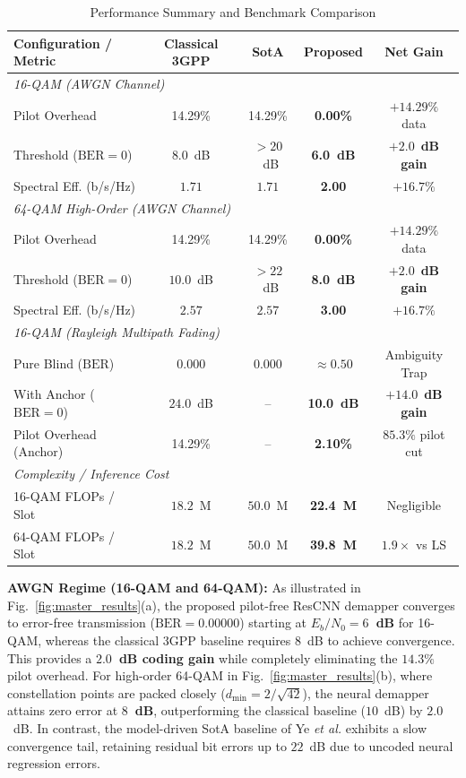 ﻿\documentclass[journal,twoside]{IEEEtran}
\begin{document}
\begin{table}[t]
\caption{Performance Summary and Benchmark Comparison}
\label{tab:perf_summary}
\centering
\footnotesize
\setlength{\tabcolsep}{3.5pt}
\begin{tabular}{lcccc}
\toprule
\textbf{Configuration / Metric} & \textbf{Classical 3GPP} & \textbf{SotA \cite{ye2018}} & \textbf{Proposed} & \textbf{Net Gain} \\
\midrule
\multicolumn{5}{l}{\textit{16-QAM (AWGN Channel)}} \\
Pilot Overhead & 14.29\% & 14.29\% & \textbf{0.00\%} & $+14.29\%$ data \\
Threshold ($\text{BER}=0$) & $8.0$~dB & $>20$~dB & \textbf{6.0~dB} & $\mathbf{+2.0}$~\textbf{dB gain} \\
Spectral Eff. (b/s/Hz) & $1.71$ & $1.71$ & \textbf{2.00} & $\mathbf{+16.7\%}$ \\
\midrule
\multicolumn{5}{l}{\textit{64-QAM High-Order (AWGN Channel)}} \\
Pilot Overhead & 14.29\% & 14.29\% & \textbf{0.00\%} & $+14.29\%$ data \\
Threshold ($\text{BER}=0$) & $10.0$~dB & $>22$~dB & \textbf{8.0~dB} & $\mathbf{+2.0}$~\textbf{dB gain} \\
Spectral Eff. (b/s/Hz) & $2.57$ & $2.57$ & \textbf{3.00} & $\mathbf{+16.7\%}$ \\
\midrule
\multicolumn{5}{l}{\textit{16-QAM (Rayleigh Multipath Fading)}} \\
Pure Blind ($\text{BER}$) & $0.000$ & $0.000$ & $\approx 0.50$ & Ambiguity Trap \\
With Anchor ($\text{BER}=0$) & $24.0$~dB & -- & \textbf{10.0~dB} & $\mathbf{+14.0}$~\textbf{dB gain} \\
Pilot Overhead (Anchor) & 14.29\% & -- & \textbf{2.10\%} & $85.3\%$ pilot cut \\
\midrule
\multicolumn{5}{l}{\textit{Complexity / Inference Cost}} \\
16-QAM FLOPs / Slot & $18.2$~M & $50.0$~M & \textbf{22.4~M} & Negligible \\
64-QAM FLOPs / Slot & $18.2$~M & $50.0$~M & \textbf{39.8~M} & $1.9\times$ vs LS \\
\bottomrule
\end{tabular}
\end{table}

\textbf{AWGN Regime (16-QAM and 64-QAM):}
As illustrated in Fig.~\ref{fig:master_results}(a), the proposed pilot-free ResCNN demapper converges
to error-free transmission ($\text{BER} = 0.00000$) starting at \textbf{$E_b/N_0 = 6$~dB} for 16-QAM,
whereas the classical 3GPP baseline requires $8$~dB to achieve convergence.
This provides a \textbf{$2.0$~dB coding gain} while completely eliminating the $14.3\%$ pilot overhead.
For high-order 64-QAM in Fig.~\ref{fig:master_results}(b), where constellation points are packed closely
($d_{\text{min}} = 2/\sqrt{42}$), the neural demapper attains zero error at \textbf{$8$~dB}, outperforming
the classical baseline ($10$~dB) by $2.0$~dB.
In contrast, the model-driven SotA baseline of Ye \textit{et al.} \cite{ye2018} exhibits a slow convergence
tail, retaining residual bit errors up to $22$~dB due to uncoded neural regression errors.
\end{document}
